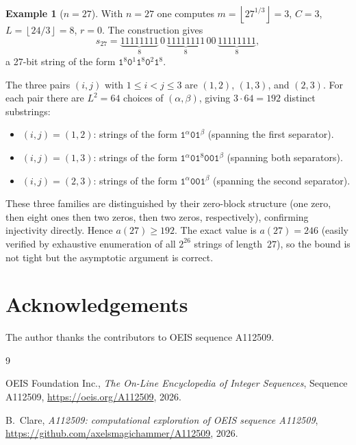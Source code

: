\documentclass[12pt,a4paper]{article}
\theoremstyle{plain}
\theoremstyle{definition}
\newtheorem{example}[theorem]{Example}
\theoremstyle{remark}
\newcommand{\floor}[1]{\left\lfloor #1 \right\rfloor}
\begin{document}
\begin{example}[$n = 27$]
  With $n = 27$ one computes $m = \floor{27^{1/3}} = 3$, $C = 3$,
  $L = \floor{24/3} = 8$, $r = 0$.  The construction gives
  \[
    s_{27} = \underbrace{11111111}_{8}\,0\,
             \underbrace{11111111}_{8}\,00\,
             \underbrace{11111111}_{8},
  \]
  a 27-bit string of the form $\texttt{1}^8\texttt{0}^1\texttt{1}^8
  \texttt{0}^2\texttt{1}^8$.

  The three pairs $(i,j)$ with $1 \le i < j \le 3$ are $(1,2)$, $(1,3)$,
  and $(2,3)$.  For each pair there are $L^2 = 64$ choices of $(\alpha,
  \beta)$, giving $3 \cdot 64 = 192$ distinct substrings:
  \begin{itemize}
    \item $(i,j) = (1,2)$: strings of the form
      $\texttt{1}^{\alpha}\texttt{0}\texttt{1}^{\beta}$
      (spanning the first separator).
    \item $(i,j) = (1,3)$: strings of the form
      $\texttt{1}^{\alpha}\texttt{0}\texttt{1}^{8}\texttt{00}\texttt{1}^{\beta}$
      (spanning both separators).
    \item $(i,j) = (2,3)$: strings of the form
      $\texttt{1}^{\alpha}\texttt{00}\texttt{1}^{\beta}$
      (spanning the second separator).
  \end{itemize}
  These three families are distinguished by their zero-block structure
  (one zero, then eight ones then two zeros, then two zeros,
  respectively), confirming injectivity directly.  Hence $a(27) \ge 192$.
  The exact value is $a(27) = 246$ (easily verified by exhaustive
  enumeration of all $2^{26}$ strings of length~$27$), so the bound is
  not tight but the asymptotic argument is correct.
\end{example}

\section*{Acknowledgements}

The author thanks the contributors to OEIS sequence A112509.


\begin{thebibliography}{9}

  OEIS Foundation Inc.,
  \emph{The On-Line Encyclopedia of Integer Sequences},
  Sequence A112509,
  \url{https://oeis.org/A112509}, 2026.

  B.~Clare,
  \emph{A112509: computational exploration of OEIS sequence A112509},
  \url{https://github.com/axelsmagichammer/A112509}, 2026.

\end{thebibliography}
\end{document}
